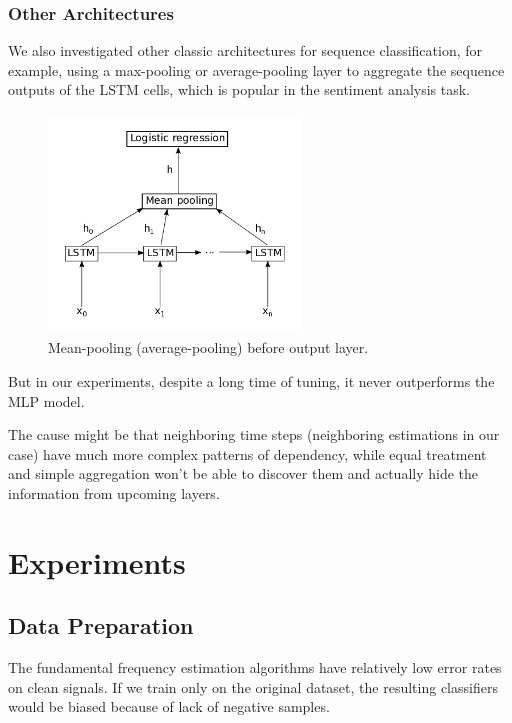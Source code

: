 \documentclass[11pt,a4paper,titlepage]{article}
\begin{document}
\newpage

\subsubsection{Other Architectures}

We also investigated other classic architectures for sequence classification, for example, using a max-pooling or average-pooling layer to aggregate the sequence outputs of the LSTM cells, which is popular in the sentiment analysis task.

\begin{figure}[htbp]
  \centering
  \includegraphics[width=0.6\textwidth]{sentiment.png}
  \caption{Mean-pooling (average-pooling) before output layer.} \label{fig:sentiment}
\end{figure}

But in our experiments, despite a long time of tuning, it never outperforms the MLP model.

The cause might be that neighboring time steps (neighboring estimations in our case) have much more complex patterns of dependency, while equal treatment and simple aggregation won't be able to discover them and actually hide the information from upcoming layers.

\newpage

\section{Experiments}

\subsection{Data Preparation}

The fundamental frequency estimation algorithms have relatively low error rates on clean signals.
If we train only on the original dataset, the resulting classifiers would be biased because of lack of negative samples.
\end{document}
